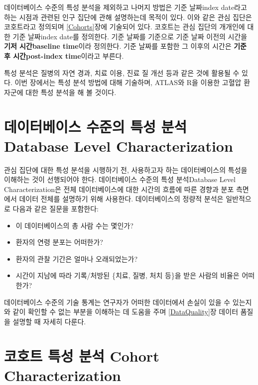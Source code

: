 \documentclass[10.5pt]{book}
\providecommand{\tightlist}{%
  \setlength{\itemsep}{0pt}\setlength{\parskip}{0pt}}
\theoremstyle{definition}
\theoremstyle{definition}
\theoremstyle{definition}
\theoremstyle{remark}
\begin{document}
데이터베이스 수준의 특성 분석을 제외하고 나머지 방법은 기준 날짜index
date라고 하는 시점과 관련된 인구 집단에 관해 설명하는데 목적이 있다.
이와 같은 관심 집단은 코호트라고 정의되며 \ref{Cohorts}장에 기술되어
있다. 코호트는 관심 집단의 개개인에 대한 기준 날짜index date를 정의한다.
기준 날짜를 기준으로 기준 날짜 이전의 시간을 \textbf{기저 시간baseline
time}이라 정의한다. 기준 날짜를 포함한 그 이후의 시간은 \textbf{기준 후
시간post-index time}이라고 부른다.

특성 분석은 질병의 자연 경과, 치료 이용, 진료 질 개선 등과 같은 것에
활용될 수 있다. 이번 장에서는 특성 분석 방법에 대해 기술하며, ATLAS와
R을 이용한 고혈압 환자군에 대한 특성 분석을 해 볼
것이다.
  

\section{데이터베이스 수준의 특성 분석 Database Level
Characterization}\label{----database-level-characterization}

관심 집단에 대한 특성 분석을 시행하기 전, 사용하고자 하는 데이터베이스의
특성을 이해하는 것이 선행되어야 한다. 데이터베이스 수준의 특성
분석Database Level Characterization은 전체 데이터베이스에 대한 시간의
흐름에 따른 경향과 분포 측면에서 데이터 전체를 설명하기 위해 사용한다.
데이터베이스의 정량적 분석은 일반적으로 다음과 같은 질문을 포함한다:

\begin{itemize}
\tightlist
\item
  이 데이터베이스의 총 사람 수는 몇인가?
\item
  환자의 연령 분포는 어떠한가?
\item
  환자의 관찰 기간은 얼마나 오래되었는가?
\item
  시간이 지남에 따라 기록/처방된 \{치료, 질병, 처치 등\}을 받은 사람의
  비율은 어떠한가?
\end{itemize}

데이터베이스 수준의 기술 통계는 연구자가 어떠한 데이터에서 손실이 있을
수 있는지와 같이 확인할 수 없는 부분을 이해하는 데 도움을 주며
\ref{DataQuality}장 데이터 품질을 설명할 때 자세히 다룬다.

\section{코호트 특성 분석 Cohort
Characterization}\label{---cohort-characterization}
\end{document}
